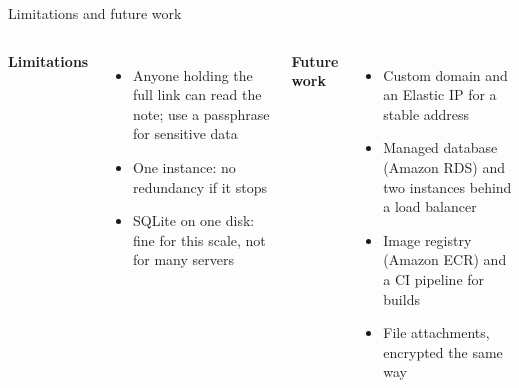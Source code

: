 \documentclass[aspectratio=169,11pt]{beamer}
\begin{document}
\begin{frame}{Limitations and future work}
  \begin{columns}[T]
    \textbf{Limitations}
    \begin{itemize}\small
      \item Anyone holding the full link can read the note; use a passphrase for sensitive data
      \item One instance: no redundancy if it stops
      \item SQLite on one disk: fine for this scale, not for many servers
    \end{itemize}
    \textbf{Future work}
    \begin{itemize}\small
      \item Custom domain and an Elastic IP for a stable address
      \item Managed database (Amazon RDS) and two instances behind a load balancer
      \item Image registry (Amazon ECR) and a CI pipeline for builds
      \item File attachments, encrypted the same way
    \end{itemize}
  \end{columns}
\end{frame}
\end{document}
